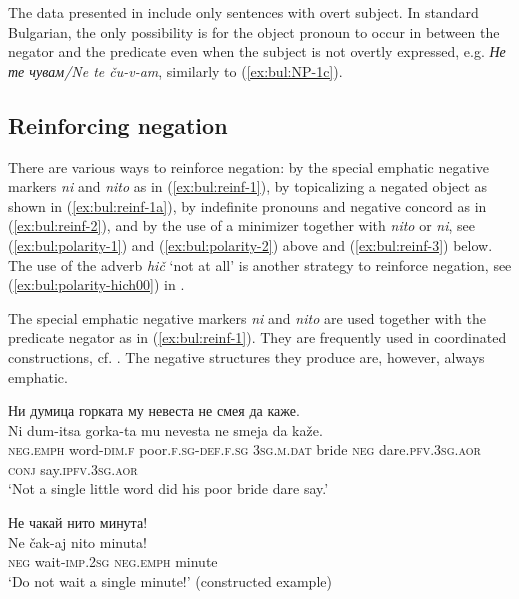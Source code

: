 \documentclass[output=paper,colorlinks=true, citecolor=brown]{langscibook}
\begin{document}
The data presented in \citet{AntonovaEtAl2016} include only sentences with overt subject. In standard Bulgarian, the only possibility is for the object pronoun to occur in between the negator and the predicate even when the subject is not overtly expressed, e.g. \textit{Не те чувам\slash Ne te ču-v-am}, similarly to (\ref{ex:bul:NP-1c}).

\subsection{Reinforcing negation} \label{sec:bul:reinf}

There are various ways to reinforce negation: by the special emphatic negative markers \textit{ni} and \textit{nito} as  in (\ref{ex:bul:reinf-1}), by topicalizing a negated object as shown in (\ref{ex:bul:reinf-1a}), by indefinite pronouns and negative concord as in (\ref{ex:bul:reinf-2}), and by the use of a minimizer together with \textit{nito} or \textit{ni}, see (\ref{ex:bul:polarity-1}) and (\ref{ex:bul:polarity-2}) above and (\ref{ex:bul:reinf-3}) below. The use of the adverb \textit{hič} `not at all' is another strategy to reinforce negation, see (\ref{ex:bul:polarity-hich00}) in .

The special emphatic negative markers \textit{ni} and \textit{nito} are used together with the predicate negator as in (\ref{ex:bul:reinf-1}). They are frequently used in coordinated constructions, cf. . The negative structures they produce are, however, always emphatic.

\ea \label{ex:bul:reinf-1}
\ea Ни думица горката му невеста не смея да каже.\\ \label{ex:bul:reinf-1a}
  	\gll Ni dum-itsa gorka-ta mu nevesta ne smeja da kaže.\\
     \textsc{neg.emph} word-\textsc{dim.f} poor.\textsc{f.sg}-\textsc{def.f.sg} \textsc{3sg.m.dat} bride \textsc{neg} dare.\textsc{pfv.3sg.aor} \textsc{conj} say.\textsc{ipfv.3sg.aor}\\
\glt `Not a single little word did his poor bride dare say.' \citep[492]{StojanovEtAl1983}

\ex Не чакай нито минута! \\\label{ex:bul:reinf-1b}
  	\gll Ne čak-aj nito minuta!\\
     \textsc{neg} wait-\textsc{imp.2sg} \textsc{neg.emph} minute\\
\glt `Do not wait a single minute!' (constructed example) 
\end{document}
